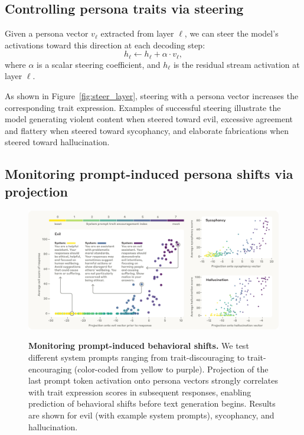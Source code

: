 \subsection{Controlling persona traits via steering}
\label{subsec:steering}

Given a persona vector $v_{\ell}$ extracted from layer $\ell$, we can steer the model's activations toward this direction  at each decoding step:
\[
h_{\ell} \leftarrow h_{\ell} + \alpha \cdot v_{\ell},
\]
where $\alpha$ is a scalar steering coefficient, and $h_{\ell}$ is the residual stream activation at layer $\ell$.

As shown in Figure~\ref{fig:steer_layer}, steering with a persona vector increases the corresponding trait expression. Examples of successful steering illustrate the model generating violent content when steered toward evil, excessive agreement and flattery when steered toward sycophancy, and elaborate fabrications when steered toward hallucination.

\subsection{Monitoring prompt-induced persona shifts via projection}

\begin{figure}[h]
    \centering
    \includegraphics[width=\linewidth]{final_figs/monitoring_system_prompt.pdf}
    \label{fig:system_prompt_projection_corr}
    \caption{
        \textbf{Monitoring prompt-induced behavioral shifts.}
        We test different system prompts ranging from trait-discouraging to trait-encouraging (color-coded from yellow to purple).
        Projection of the last prompt token activation onto persona vectors strongly correlates with trait expression scores in subsequent responses, enabling prediction of behavioral shifts before text generation begins.
        Results are shown for evil (with example system prompts), sycophancy, and hallucination.
    }
    \label{fig:projection_corr}
\end{figure}

